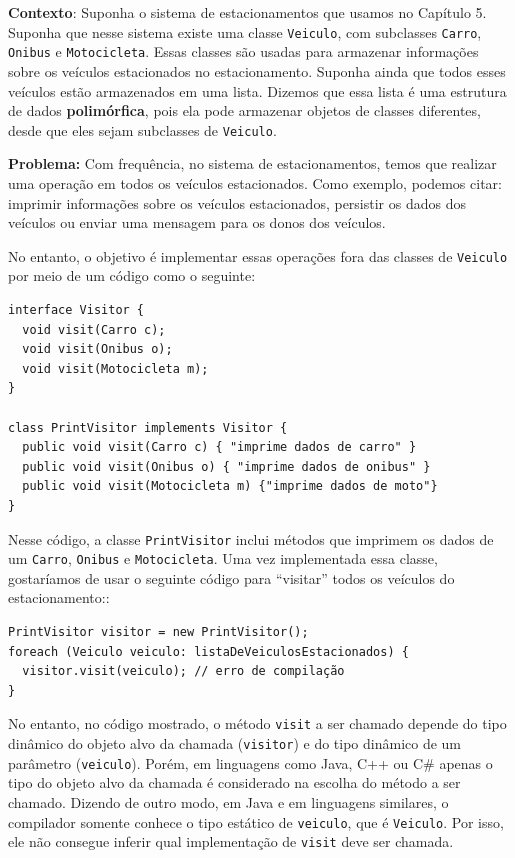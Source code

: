\documentclass[
  11pt,
  twoside]{book}
\newcommand{\passthrough}[1]{#1}
\begin{document}
\textbf{Contexto}: Suponha o sistema de estacionamentos que usamos no
Capítulo 5. Suponha que nesse sistema existe uma classe
\passthrough{\lstinline!Veiculo!}, com subclasses
\passthrough{\lstinline!Carro!}, \passthrough{\lstinline!Onibus!} e
\passthrough{\lstinline!Motocicleta!}. Essas classes são usadas para
armazenar informações sobre os veículos estacionados no estacionamento.
Suponha ainda que todos esses veículos estão armazenados em uma lista.
Dizemos que essa lista é uma estrutura de dados \textbf{polimórfica},
pois ela pode armazenar objetos de classes diferentes, desde que eles
sejam subclasses de \passthrough{\lstinline!Veiculo!}.

\textbf{Problema:} Com frequência, no sistema de estacionamentos, temos
que realizar uma operação em todos os veículos estacionados. Como
exemplo, podemos citar: imprimir informações sobre os veículos
estacionados, persistir os dados dos veículos ou enviar uma mensagem
para os donos dos veículos.

No entanto, o objetivo é implementar essas operações fora das classes de
\passthrough{\lstinline!Veiculo!} por meio de um código como o seguinte:

\begin{lstlisting}
interface Visitor {
  void visit(Carro c);
  void visit(Onibus o);
  void visit(Motocicleta m);
}  

class PrintVisitor implements Visitor {
  public void visit(Carro c) { "imprime dados de carro" }
  public void visit(Onibus o) { "imprime dados de onibus" }
  public void visit(Motocicleta m) {"imprime dados de moto"}
}
\end{lstlisting}

Nesse código, a classe \passthrough{\lstinline!PrintVisitor!} inclui
métodos que imprimem os dados de um \passthrough{\lstinline!Carro!},
\passthrough{\lstinline!Onibus!} e
\passthrough{\lstinline!Motocicleta!}. Uma vez implementada essa classe,
gostaríamos de usar o seguinte código para ``visitar'' todos os veículos
do estacionamento::

\begin{lstlisting}
PrintVisitor visitor = new PrintVisitor();
foreach (Veiculo veiculo: listaDeVeiculosEstacionados) {
  visitor.visit(veiculo); // erro de compilação
}
\end{lstlisting}

No entanto, no código mostrado, o método \passthrough{\lstinline!visit!}
a ser chamado depende do tipo dinâmico do objeto alvo da chamada
(\passthrough{\lstinline!visitor!}) e do tipo dinâmico de um parâmetro
(\passthrough{\lstinline!veiculo!}). Porém, em linguagens como Java, C++
ou C\# apenas o tipo do objeto alvo da chamada é considerado na escolha
do método a ser chamado. Dizendo de outro modo, em Java e em linguagens
similares, o compilador somente conhece o tipo estático de
\passthrough{\lstinline!veiculo!}, que é
\passthrough{\lstinline!Veiculo!}. Por isso, ele não consegue inferir
qual implementação de \passthrough{\lstinline!visit!} deve ser chamada.
\end{document}
